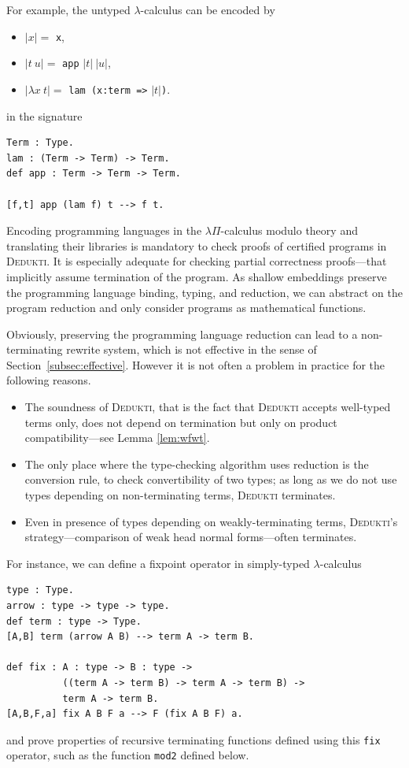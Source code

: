 \documentclass[english]{lipics}
\newcommand\lst[1]{{\rm \lstinline{#1}}}
\begin{document}
For example, the untyped
$\lambda$-calculus can be encoded by
\begin{itemize}
\item $|x| = $ \lst{x},
\item $|t~u| =$ \lst{app} $|t|~|u|$,
\item $|\lambda x~t| = $ \lst{lam (x:term =>} $|t|$\lst{)}.
\end{itemize}
in the signature
\begin{lstlisting}
Term : Type.
lam : (Term -> Term) -> Term.
def app : Term -> Term -> Term.

[f,t] app (lam f) t --> f t.
\end{lstlisting}

Encoding programming languages in the $\lambda \Pi$-calculus modulo
theory and translating their libraries is
mandatory to check proofs of certified programs in \textsc{Dedukti}.
It is especially adequate for checking partial correctness
proofs---that implicitly assume termination of the program. As shallow
embeddings preserve the programming language binding, typing, and
reduction, we can abstract on the program reduction and only consider
programs as mathematical functions.

Obviously, preserving the programming language reduction can lead to a
non-terminating rewrite system, which is not effective in the
sense of Section~\ref{subsec:effective}. However it is not often a
problem in practice for the following reasons.
\begin{itemize}
\item The soundness of \textsc{Dedukti}, that is the fact that
\textsc{Dedukti} accepts well-typed terms only,
 does not depend on termination but only
  on product
\linebreak
compatibility---see Lemma \ref{lem:wfwt}.
\item The only place where the type-checking algorithm uses
  reduction is the conversion rule, to check convertibility of
  two types; as long as we do not use types depending on
  non-terminating terms, \textsc{Dedukti} terminates.
\item Even in presence of types depending on weakly-terminating terms,
  \textsc{Dedukti}'s strategy---comparison of weak head normal
  forms---often terminates.
\end{itemize}

For instance,
we can define a fixpoint operator in
simply-typed $\lambda$-calculus
\begin{lstlisting}
type : Type.
arrow : type -> type -> type.
def term : type -> Type.
[A,B] term (arrow A B) --> term A -> term B.

def fix : A : type -> B : type ->
          ((term A -> term B) -> term A -> term B) ->
          term A -> term B.
[A,B,F,a] fix A B F a --> F (fix A B F) a.
\end{lstlisting}
and prove properties of recursive terminating functions defined using
this \lst{fix} operator, such as the function \lst{mod2} defined below.
\end{document}

